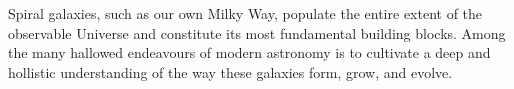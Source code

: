 Spiral galaxies, such as our own Milky Way, populate the entire extent of the observable Universe and constitute its most fundamental building blocks. Among the many hallowed endeavours of modern astronomy is to cultivate a deep and hollistic understanding of the way these galaxies form, grow, and evolve. 